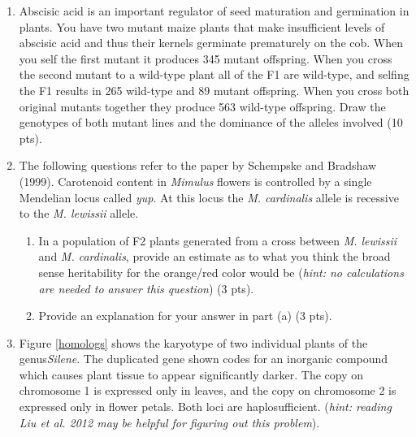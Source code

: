 \documentclass[]{article}
\begin{document}
\begin{enumerate}
\newpage
\item Abscisic acid is an important regulator of seed maturation and germination in plants. You have two mutant maize plants that make insufficient levels of abscisic acid and thus their kernels germinate prematurely on the cob. When you self the first mutant it produces 345 mutant offspring. When you cross the second mutant to a wild-type plant all of the F1 are wild-type, and selfing the F1 results in 265 wild-type and 89 mutant offspring.  When you cross both original mutants together they produce 563 wild-type offspring.  Draw the genotypes of both mutant lines and the dominance of the alleles involved (10 pts).

\newpage
\item The following questions refer to the paper by Schempske and Bradshaw (1999). Carotenoid content in \emph{Mimulus} flowers is controlled by a single Mendelian locus called \emph{yup}. At this locus the \emph{M. cardinalis} allele is recessive to the \emph{M. lewissii} allele. 
\begin{enumerate}
\item In a population of F2 plants generated from a cross between \emph{M. lewissii}  and \emph{M. cardinalis}, provide an estimate as to what you think the broad sense heritability for the orange/red color would be (\emph{hint: no calculations are needed to answer this question}) (3 pts).
\item Provide an explanation for your answer in part (a) (3 pts).
\end{enumerate}

\newpage
\item Figure \ref{homologs} shows the karyotype of two individual plants of the genus\emph{Silene}.  The duplicated gene shown codes for an inorganic compound which causes plant tissue to appear significantly darker. The copy on chromosome 1 is expressed only in leaves, and the copy on chromosome 2 is expressed only in flower petals. Both loci are haplosufficient. (\emph{hint: reading Liu et al. 2012 may be helpful for figuring out this problem}).


\end{enumerate}
\end{document}
